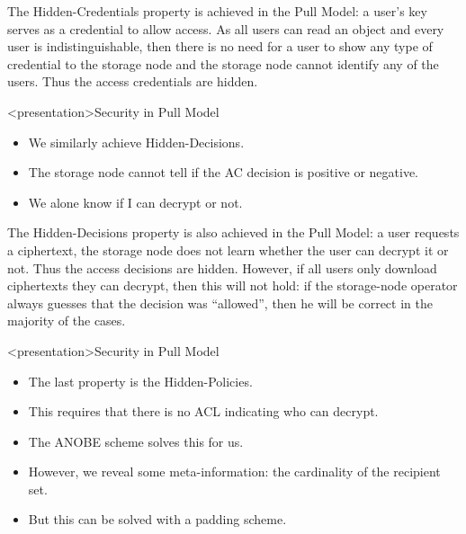 The Hidden-Credentials property is achieved in the Pull Model: a user's key 
serves as a credential to allow access.
As all users can read an object and every user is indistinguishable, then there 
is no need for a user to show any type of credential to the storage node and 
the storage node cannot identify any of the users.
Thus the access credentials are hidden.

\begin{frame}<presentation>{Security in Pull Model}
  \begin{itemize}

    \item We similarly achieve Hidden-Decisions.

    \item The storage node cannot tell if the \ac{AC} decision is positive or 
      negative.

    \item We alone know if I can decrypt or not.

  \end{itemize}
\end{frame}

The Hidden-Decisions property is also achieved in the Pull Model: a user 
requests a ciphertext, the storage node does not learn whether the user can 
decrypt it or not.
Thus the access decisions are hidden.
However, if all users only download ciphertexts they can decrypt, then this 
will not hold:
if the storage-node operator always guesses that the decision was 
\enquote{allowed}, then he will be correct in the majority of the cases.

\begin{frame}<presentation>{Security in Pull Model}
  \begin{itemize}

    \item The last property is the Hidden-Policies.
      
    \item This requires that there is no \ac{ACL} indicating who can decrypt.

    \item The \ac{ANOBE} scheme solves this for us.

      \pause{}

    \item However, we reveal some meta-information: the cardinality of the 
      recipient set.

    \item But this can be solved with a padding scheme.

  \end{itemize}
\end{frame}

